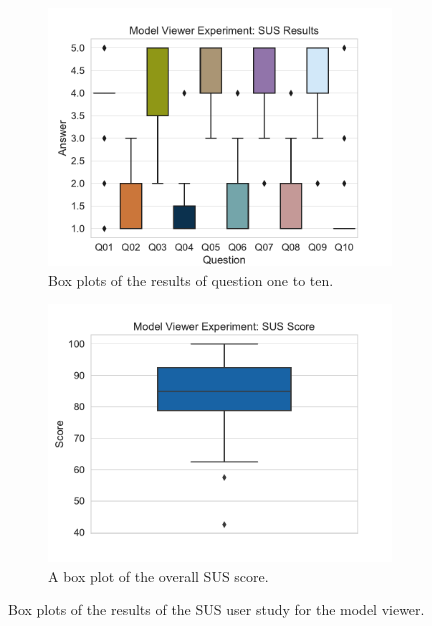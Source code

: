 \begin{figure}[H]
	\centering
	\begin{subfigure}{.48\linewidth}%
		\centering
		\includegraphics[width=\linewidth]{figures/evaluation/res_exp_mv.pdf}
		\caption{Box plots of the results of question one to ten.}\label{fig:res-exp-mv}
	\end{subfigure}%
	\hspace{0.03\linewidth}%
	\begin{subfigure}{.48\linewidth}%
		\centering
		\includegraphics[width=\linewidth]{figures/evaluation/score_exp_mv.pdf}
		\caption{A box plot of the overall \gls{SUS} score.}\label{fig:score-exp-mv}
	\end{subfigure}%
	\caption[Model viewer SUS results]{Box plots of the results of the \gls{SUS} user study for the model viewer.}\label{fig:exp-mv-stats}
\end{figure}

